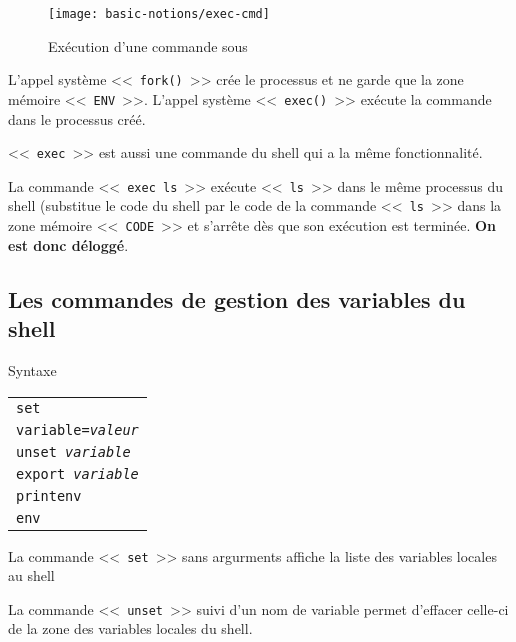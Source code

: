 \begin{figure}[hbtp]
\centering
\texttt{[image: basic-notions/exec-cmd]}
\caption{\label{fig-basnot-exec-cmd}Ex{\'e}cution d'une commande sous {\Unix}}
\end{figure}

L'appel syst{\`e}me <<~\texttt{fork()}~>> cr{\'e}e le processus et ne garde
que la zone m{\'e}moire <<~\texttt{ENV}~>>. L'appel syst{\`e}me
<<~\texttt{exec()}~>> ex{\'e}cute la commande dans le processus cr{\'e}{\'e}.

\begin{remarque}
<<~\texttt{exec}~>> est aussi une commande du shell qui a la m{\^e}me fonctionnalit{\'e}.
\end{remarque}

La commande <<~\verb=exec ls=~>> ex{\'e}cute <<~\texttt{ls}~>> dans le m{\^e}me processus
du shell (substitue le code du shell par le code de la commande <<~\texttt{ls}~>>
dans la zone m{\'e}moire <<~\texttt{CODE}~>> et s'arr{\^e}te d{\`e}s que son ex{\'e}cution est
termin{\'e}e. {\bf On est donc d{\'e}logg{\'e}}.

\subsection{Les commandes de gestion des variables du shell}

\begin{definition}{Syntaxe}
\begin{tabular}{@{\hspace{1cm}}l}
	\texttt{set}\\[0.2cm]
	\texttt{variable=\textsl{valeur}}\\[0.2cm]
	\texttt{unset \textsl{variable}}\\[0.2cm]
	\texttt{export \textsl{variable}}\\[0.2cm]
	\texttt{printenv}\\[0.2cm]
	\texttt{env}\\
\end{tabular}
\end{definition}

La commande <<~\texttt{set}~>> sans argurments
affiche la liste des variables locales au shell

La commande <<~\texttt{unset}~>> suivi d'un nom de variable permet
d'effacer celle-ci de la zone des variables locales du shell.

